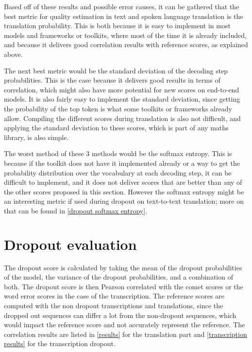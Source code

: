 Based off of these results and possible error causes, it can be gathered that the best metric for quality estimation in text and spoken language translation is the translation probability.
This is both because it is easy to implement in most models and frameworks or toolkits, where most of the time it is already included, and because it delivers good correlation results with reference scores, as explained above.

The next best metric would be the standard deviation of the decoding step probabilities. This is the case because it delivers good results in terms of correlation, which might also have more potential for new scores on end-to-end models. It is also fairly easy to implement the standard deviation, since getting the probability of the top token is what some toolkits or frameworks already allow. Compiling the different scores during translation is also not difficult, and applying the standard deviation to these scores, which is part of any maths library, is also simple. 

The worst method of these 3 methods would be the softmax entropy. This is because if the toolkit does not have it implemented already or a way to get the probability distribution over the vocabulary at each decoding step, it can be difficult to implement, and it does not deliver scores that are better than any of the other scores proposed in this section. However the softmax entropy might be an interesting metric if used during dropout on text-to-text translation; more on that can be found in \autoref{dropout softmax entropy}.

\section{Dropout evaluation}
The dropout score is calculated by taking the mean of the dropout probabilities of the model, the variance of the dropout probabilities, and a combination of both. The dropout score is then Pearson correlated with the comet scores or the word error scores in the case of the transcription. 
The reference scores are computed with the non dropout transcriptions and translations, since the dropped out sequences can differ a lot from the non-dropout sequences, which would impact the reference score and not accurately represent the reference. 
The correlation results are listed in \autoref{results} for the translation part and \autoref{transcription results} for the transcription dropout. 

